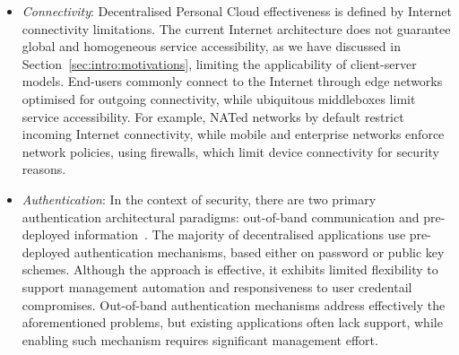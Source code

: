 \begin{itemize}
  \item {\it Connectivity}\/: Decentralised Personal Cloud effectiveness is
    defined by Internet connectivity limitations.  The current Internet
    architecture does not guarantee global and homogeneous service
    accessibility, as we have discussed in Section~\ref{sec:intro:motivations},
    limiting the applicability of client-server models.  End-users commonly
    connect to the Internet through edge networks optimised for outgoing
    connectivity, while ubiquitous middleboxes limit service accessibility. For
    example, NATed networks by default restrict incoming Internet connectivity,
    while mobile and enterprise networks enforce network policies, using
    firewalls, which limit device connectivity for security reasons.

  \item {\it Authentication}\/: In the context of security, there are two  
    primary authentication architectural paradigms: out-of-band communication
    and pre-deployed information~. The majority of decentralised
    applications use pre-deployed authentication mechanisms, based either on
    password or public key schemes. Although the approach is effective, it
    exhibits limited flexibility to support management automation and
    responsiveness to user credentail compromises. Out-of-band
    authentication mechanisms address effectively the aforementioned problems,
    but existing applications often lack support, while enabling such mechanism
    requires significant management effort. 


\end{itemize}
